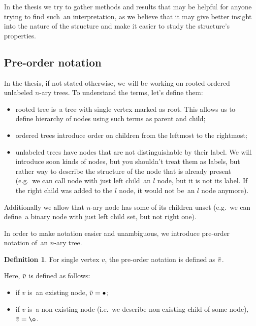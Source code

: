 \documentclass[final]{article}
\theoremstyle{definition}
\newtheorem{definition}{Definition}[subsection]
\theoremstyle{definition}
\theoremstyle{remark}
\newcommand{\ols}[1]{\mskip.5\thinmuskip\overline{\mskip-.5\thinmuskip {#1} \mskip-.5\thinmuskip}\mskip.5\thinmuskip} %
\newcommand{\enc}[1]{\ensuremath{\ols{#1}}}
\DeclareMathOperator{\n}{\bullet}
\DeclareMathOperator{\no}{\o}
\begin{document}
In the thesis we try to gather methods and results that may be helpful for anyone trying to find such~an interpretation, as we believe that it may give better insight into the nature of the structure and make it easier to study the structure's properties.

\subsection{Pre-order notation}%
\label{sub:pre_order_notation}

In the thesis, if not stated otherwise, we will be working on rooted ordered unlabeled \(n\)-ary trees. To understand the terms, let's define them:
\begin{itemize}
    \item rooted tree is~a tree with single vertex marked as root. This allows us to define hierarchy of nodes using such terms as parent and child;
    \item ordered trees introduce order on children from the leftmost to the rightmost;
    \item unlabeled trees have nodes that are not distinguishable by their label. We will introduce soon kinds of nodes, but you shouldn't treat them as labels, but rather way to describe the structure of the node that is already present (e.g.~we can call node with just left child~an \(l\) node, but it is not its label. If the right child was added to the \(l\) node, it would not be~an \(l\) node anymore).
\end{itemize}
Additionally we allow that \(n\)-ary node has some of its children unset (e.g.~we can define~a binary node with just left child set, but not right one).

In order to make notation easier and unambiguous, we introduce pre-order notation of~an \(n\)-ary tree.

\begin{definition}
    For single vertex \(v\), the pre-order notation is defined as \(\enc{v}\).
\end{definition}

Here, \(\enc{v}\) is defined as follows:
\begin{itemize}
    \item if \(v\) is~an existing node, \(\enc{v} = \n\);
    \item if \(v\) is~a non-existing node (i.e.~we describe non-existing child of some node), \(\enc{v} = \no\).
\end{itemize}
\end{document}

